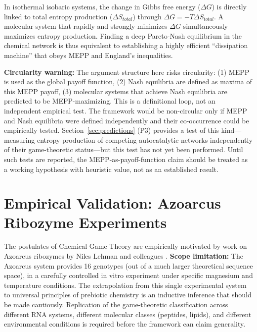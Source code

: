\documentclass[12pt,a4paper]{article}
\theoremstyle{remark}
\begin{document}
In isothermal isobaric systems, the change in Gibbs free energy ($\Delta G$) is directly linked to total entropy production ($\Delta S_{total}$) through $\Delta G = -T\Delta S_{total}$. A molecular system that rapidly and strongly minimizes $\Delta G$ simultaneously maximizes entropy production. Finding a deep Pareto-Nash equilibrium in the chemical network is thus equivalent to establishing a highly efficient ``dissipation machine'' that obeys MEPP and England's inequalities.

\textbf{Circularity warning:} The argument structure here risks circularity: (1) MEPP is used as the global payoff function, (2) Nash equilibria are defined as maxima of this MEPP payoff, (3) molecular systems that achieve Nash equilibria are predicted to be MEPP-maximizing. This is a definitional loop, not an independent empirical test. The framework would be non-circular only if MEPP and Nash equilibria were defined independently and their co-occurrence could be empirically tested. Section~\ref{sec:predictions} (P3) provides a test of this kind---measuring entropy production of competing autocatalytic networks independently of their game-theoretic status---but this test has not yet been performed. Until such tests are reported, the MEPP-as-payoff-function claim should be treated as a working hypothesis with heuristic value, not as an established result.

\section{Empirical Validation: Azoarcus Ribozyme Experiments}
\label{sec:azoarcus}

The postulates of Chemical Game Theory are empirically motivated by work on Azoarcus ribozymes by Niles Lehman and colleagues \citep{AzoarcusPNAS,AzoarcusPMC}. \textbf{Scope limitation:} The Azoarcus system provides 16 genotypes (out of a much larger theoretical sequence space), in a carefully controlled in vitro experiment under specific magnesium and temperature conditions. The extrapolation from this single experimental system to universal principles of prebiotic chemistry is an inductive inference that should be made cautiously. Replication of the game-theoretic classification across different RNA systems, different molecular classes (peptides, lipids), and different environmental conditions is required before the framework can claim generality.
\end{document}
